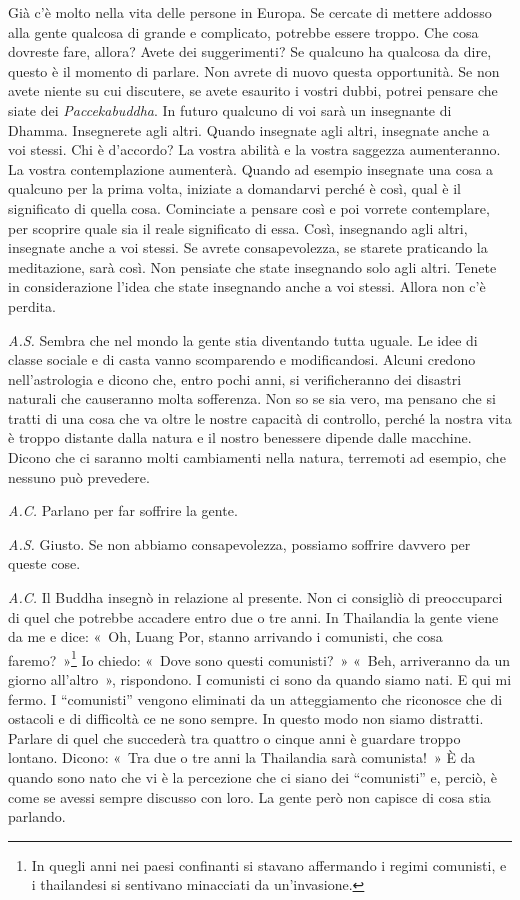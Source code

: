 Già c'è molto nella vita delle persone in Europa. Se cercate di mettere
addosso alla gente qualcosa di grande e complicato, potrebbe essere
troppo. Che cosa dovreste fare, allora? Avete dei suggerimenti? Se
qualcuno ha qualcosa da dire, questo è il momento di parlare. Non avrete
di nuovo questa opportunità. Se non avete niente su cui discutere, se
avete esaurito i vostri dubbi, potrei pensare che siate dei
\emph{Paccekabuddha}. In futuro qualcuno di voi sarà un insegnante di
Dhamma. Insegnerete agli altri. Quando insegnate agli altri, insegnate
anche a voi stessi. Chi è d'accordo? La vostra abilità e la vostra
saggezza aumenteranno. La vostra contemplazione aumenterà. Quando ad
esempio insegnate una cosa a qualcuno per la prima volta, iniziate a
domandarvi perché è così, qual è il significato di quella cosa.
Cominciate a pensare così e poi vorrete contemplare, per scoprire quale
sia il reale significato di essa. Così, insegnando agli altri, insegnate
anche a voi stessi. Se avrete consapevolezza, se starete praticando la
meditazione, sarà così. Non pensiate che state insegnando solo agli
altri. Tenete in considerazione l'idea che state insegnando anche a voi
stessi. Allora non c'è perdita.

\emph{A.S.} Sembra che nel mondo la gente stia diventando tutta uguale. Le
idee di classe sociale e di casta vanno scomparendo e modificandosi.
Alcuni credono nell'astrologia e dicono che, entro pochi anni, si
verificheranno dei disastri naturali che causeranno molta sofferenza.
Non so se sia vero, ma pensano che si tratti di una cosa che va oltre le
nostre capacità di controllo, perché la nostra vita è troppo distante
dalla natura e il nostro benessere dipende dalle macchine. Dicono che ci
saranno molti cambiamenti nella natura, terremoti ad esempio, che
nessuno può prevedere.

\emph{A.C.} Parlano per far soffrire la gente.

\emph{A.S.} Giusto. Se non abbiamo consapevolezza, possiamo soffrire davvero
per queste cose.

\emph{A.C.} Il Buddha insegnò in relazione al presente. Non ci consigliò di
preoccuparci di quel che potrebbe accadere entro due o tre anni. In
Thailandia la gente viene da me e dice: «~Oh, Luang Por, stanno
arrivando i comunisti, che cosa faremo?~»\footnote{In quegli anni nei
  paesi confinanti si stavano affermando i regimi comunisti, e i
  thailandesi si sentivano minacciati da un'invasione.} Io chiedo:
«~Dove sono questi comunisti?~» «~Beh, arriveranno da un giorno
all'altro~», rispondono. I comunisti ci sono da quando siamo nati. E qui
mi fermo. I ``comunisti'' vengono eliminati da un atteggiamento che
riconosce che di ostacoli e di difficoltà ce ne sono sempre. In questo
modo non siamo distratti. Parlare di quel che succederà tra quattro o
cinque anni è guardare troppo lontano. Dicono: «~Tra due o tre anni la
Thailandia sarà comunista!~» È da quando sono nato che vi è la
percezione che ci siano dei ``comunisti'' e, perciò, è come se avessi
sempre discusso con loro. La gente però non capisce di cosa stia
parlando.

